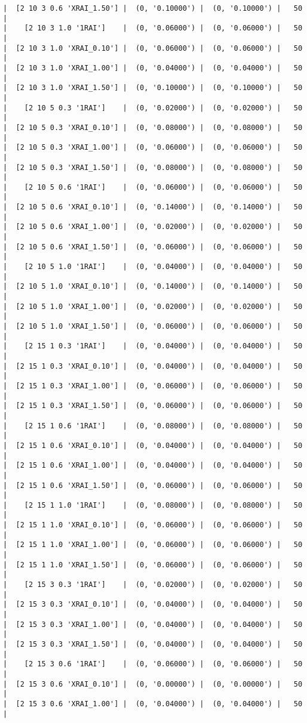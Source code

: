 \documentclass{article}
\begin{document}
\begin{verbatim}
|  [2 10 3 0.6 'XRAI_1.50'] |  (0, '0.10000') |  (0, '0.10000') |   50  |
|    [2 10 3 1.0 '1RAI']    |  (0, '0.06000') |  (0, '0.06000') |   50  |
|  [2 10 3 1.0 'XRAI_0.10'] |  (0, '0.06000') |  (0, '0.06000') |   50  |
|  [2 10 3 1.0 'XRAI_1.00'] |  (0, '0.04000') |  (0, '0.04000') |   50  |
|  [2 10 3 1.0 'XRAI_1.50'] |  (0, '0.10000') |  (0, '0.10000') |   50  |
|    [2 10 5 0.3 '1RAI']    |  (0, '0.02000') |  (0, '0.02000') |   50  |
|  [2 10 5 0.3 'XRAI_0.10'] |  (0, '0.08000') |  (0, '0.08000') |   50  |
|  [2 10 5 0.3 'XRAI_1.00'] |  (0, '0.06000') |  (0, '0.06000') |   50  |
|  [2 10 5 0.3 'XRAI_1.50'] |  (0, '0.08000') |  (0, '0.08000') |   50  |
|    [2 10 5 0.6 '1RAI']    |  (0, '0.06000') |  (0, '0.06000') |   50  |
|  [2 10 5 0.6 'XRAI_0.10'] |  (0, '0.14000') |  (0, '0.14000') |   50  |
|  [2 10 5 0.6 'XRAI_1.00'] |  (0, '0.02000') |  (0, '0.02000') |   50  |
|  [2 10 5 0.6 'XRAI_1.50'] |  (0, '0.06000') |  (0, '0.06000') |   50  |
|    [2 10 5 1.0 '1RAI']    |  (0, '0.04000') |  (0, '0.04000') |   50  |
|  [2 10 5 1.0 'XRAI_0.10'] |  (0, '0.14000') |  (0, '0.14000') |   50  |
|  [2 10 5 1.0 'XRAI_1.00'] |  (0, '0.02000') |  (0, '0.02000') |   50  |
|  [2 10 5 1.0 'XRAI_1.50'] |  (0, '0.06000') |  (0, '0.06000') |   50  |
|    [2 15 1 0.3 '1RAI']    |  (0, '0.04000') |  (0, '0.04000') |   50  |
|  [2 15 1 0.3 'XRAI_0.10'] |  (0, '0.04000') |  (0, '0.04000') |   50  |
|  [2 15 1 0.3 'XRAI_1.00'] |  (0, '0.06000') |  (0, '0.06000') |   50  |
|  [2 15 1 0.3 'XRAI_1.50'] |  (0, '0.06000') |  (0, '0.06000') |   50  |
|    [2 15 1 0.6 '1RAI']    |  (0, '0.08000') |  (0, '0.08000') |   50  |
|  [2 15 1 0.6 'XRAI_0.10'] |  (0, '0.04000') |  (0, '0.04000') |   50  |
|  [2 15 1 0.6 'XRAI_1.00'] |  (0, '0.04000') |  (0, '0.04000') |   50  |
|  [2 15 1 0.6 'XRAI_1.50'] |  (0, '0.06000') |  (0, '0.06000') |   50  |
|    [2 15 1 1.0 '1RAI']    |  (0, '0.08000') |  (0, '0.08000') |   50  |
|  [2 15 1 1.0 'XRAI_0.10'] |  (0, '0.06000') |  (0, '0.06000') |   50  |
|  [2 15 1 1.0 'XRAI_1.00'] |  (0, '0.06000') |  (0, '0.06000') |   50  |
|  [2 15 1 1.0 'XRAI_1.50'] |  (0, '0.06000') |  (0, '0.06000') |   50  |
|    [2 15 3 0.3 '1RAI']    |  (0, '0.02000') |  (0, '0.02000') |   50  |
|  [2 15 3 0.3 'XRAI_0.10'] |  (0, '0.04000') |  (0, '0.04000') |   50  |
|  [2 15 3 0.3 'XRAI_1.00'] |  (0, '0.04000') |  (0, '0.04000') |   50  |
|  [2 15 3 0.3 'XRAI_1.50'] |  (0, '0.04000') |  (0, '0.04000') |   50  |
|    [2 15 3 0.6 '1RAI']    |  (0, '0.06000') |  (0, '0.06000') |   50  |
|  [2 15 3 0.6 'XRAI_0.10'] |  (0, '0.00000') |  (0, '0.00000') |   50  |
|  [2 15 3 0.6 'XRAI_1.00'] |  (0, '0.04000') |  (0, '0.04000') |   50  |

\end{verbatim}
\end{document}
